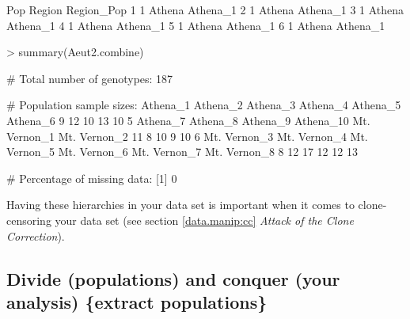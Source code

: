 \documentclass[letterpaper]{article}
\begin{document}
\begin{Schunk}
\begin{Soutput}
  Pop Region Region_Pop
1   1 Athena   Athena_1
2   1 Athena   Athena_1
3   1 Athena   Athena_1
4   1 Athena   Athena_1
5   1 Athena   Athena_1
6   1 Athena   Athena_1
\end{Soutput}
\begin{Sinput}
> summary(Aeut2.combine)
\end{Sinput}
\begin{Soutput}
 # Total number of genotypes:  187 

 # Population sample sizes:  
    Athena_1     Athena_2     Athena_3     Athena_4     Athena_5     Athena_6 
           9           12           10           13           10            5 
    Athena_7     Athena_8     Athena_9    Athena_10 Mt. Vernon_1 Mt. Vernon_2 
          11            8           10            9           10            6 
Mt. Vernon_3 Mt. Vernon_4 Mt. Vernon_5 Mt. Vernon_6 Mt. Vernon_7 Mt. Vernon_8 
           8           12           17           12           12           13 

 # Percentage of missing data:  
[1] 0
\end{Soutput}
\end{Schunk}
% 
Having these hierarchies in your data set is important when it comes to clone-censoring your data set (see section \ref{data.manip:cc} \textit{Attack of the Clone Correction}).
\subsection{Divide (populations) and conquer (your analysis) \{extract populations\}}\label{data.manip:divide}
\end{document}
